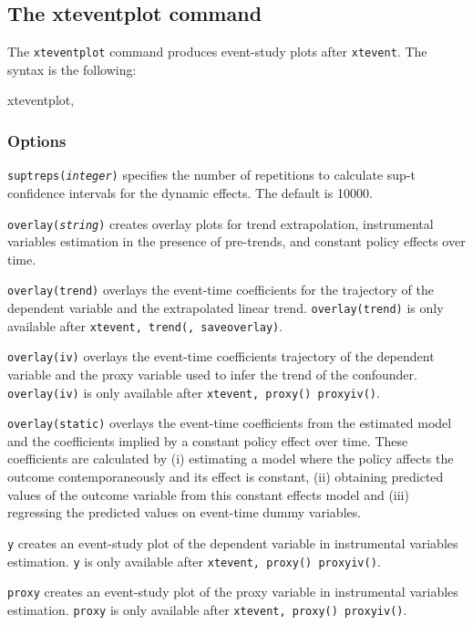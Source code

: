\documentclass[12pt]{article}
\begin{document}
\subsection{The xteventplot command}
The \texttt{xteventplot} command produces event-study plots after \texttt{xtevent}. The syntax is the following:
\begin{stsyntax}
	xteventplot,
\end{stsyntax}

\subsubsection{Options}
\hangpara
\sloppypar \noindent
\texttt{suptreps({\it integer})} specifies the number of repetitions to calculate \citet{montiel2019simultaneous} sup-t confidence intervals for the dynamic effects. The default is 10000.


\hangpara
\texttt{overlay({\it string})} creates overlay plots for trend extrapolation, instrumental variables estimation in the presence of pre-trends, and constant policy effects over time.

\morehangpara
\texttt{overlay(trend)} overlays the event-time coefficients for the trajectory of the dependent variable and the extrapolated linear trend.
\texttt{overlay(trend)} is only available after \texttt{xtevent, trend(, saveoverlay)}.

\morehangpara
\texttt{overlay(iv)} overlays the event-time coefficients trajectory of the dependent variable and the proxy variable used to infer the trend of the confounder.
\texttt{overlay(iv)} is only available after \texttt{xtevent, proxy() proxyiv()}.

\morehangpara
\texttt{overlay(static)} overlays the event-time coefficients from the estimated model and the coefficients implied by a constant policy effect over time.
These coefficients are calculated by
(i) estimating a model where the policy affects the outcome contemporaneously and its effect is constant,
(ii) obtaining predicted values of the outcome variable from this constant effects model and
(iii) regressing the predicted values on event-time dummy variables.

\hangpara
\texttt{y} creates an event-study plot of the dependent variable in instrumental variables estimation.
\texttt{y} is only available after \texttt{xtevent, proxy() proxyiv()}.

\hangpara
\texttt{proxy} creates an event-study plot of the proxy variable in instrumental variables estimation.
\texttt{proxy} is only available after \texttt{xtevent, proxy() proxyiv()}.
\end{document}
